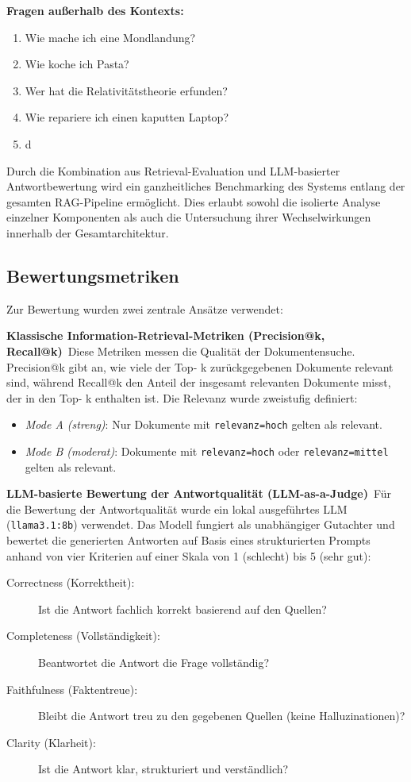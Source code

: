 \textbf{Fragen außerhalb des Kontexts:}
\begin{enumerate}
    \item Wie mache ich eine Mondlandung?
    \item Wie koche ich Pasta?
    \item Wer hat die Relativitätstheorie erfunden?
    \item Wie repariere ich einen kaputten Laptop?
    \item d
\end{enumerate}

Durch die Kombination aus Retrieval-Evaluation und LLM-basierter Antwortbewertung wird ein ganzheitliches Benchmarking des Systems entlang der gesamten RAG-Pipeline ermöglicht. Dies erlaubt sowohl die isolierte Analyse einzelner Komponenten als auch die Untersuchung ihrer Wechselwirkungen innerhalb der Gesamtarchitektur.

\subsection{Bewertungsmetriken}

Zur Bewertung wurden zwei zentrale Ansätze verwendet:

\textbf{Klassische Information-Retrieval-Metriken (Precision@k, Recall@k)}\
Diese Metriken messen die Qualität der Dokumentensuche. Precision@k gibt an, wie viele der Top- k  zurückgegebenen Dokumente relevant sind, während Recall@k den Anteil der insgesamt relevanten Dokumente misst, der in den Top- k  enthalten ist. Die Relevanz wurde zweistufig definiert:
\begin{itemize}
    \item \textit{Mode A (streng)}: Nur Dokumente mit \texttt{relevanz=hoch} gelten als relevant.
    \item \textit{Mode B (moderat)}: Dokumente mit \texttt{relevanz=hoch} oder \texttt{relevanz=mittel} gelten als relevant.
\end{itemize}

\textbf{LLM-basierte Bewertung der Antwortqualität (LLM-as-a-Judge)}\
Für die Bewertung der Antwortqualität wurde ein lokal ausgeführtes LLM (\texttt{llama3.1:8b}) verwendet. Das Modell fungiert als unabhängiger Gutachter und bewertet die generierten Antworten auf Basis eines strukturierten Prompts anhand von vier Kriterien auf einer Skala von 1 (schlecht) bis 5 (sehr gut):

\begin{description}
    \item[Correctness (Korrektheit):] Ist die Antwort fachlich korrekt basierend auf den Quellen?
    \item[Completeness (Vollständigkeit):] Beantwortet die Antwort die Frage vollständig?
    \item[Faithfulness (Faktentreue):] Bleibt die Antwort treu zu den gegebenen Quellen (keine Halluzinationen)?
    \item[Clarity (Klarheit):] Ist die Antwort klar, strukturiert und verständlich?
\end{description}

